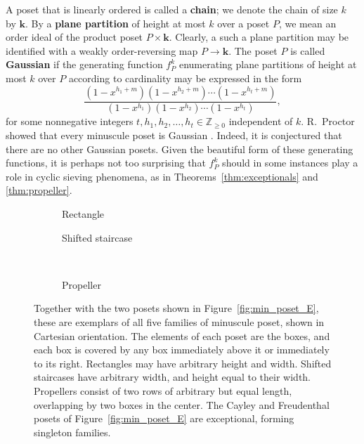 \documentclass[12pt]{amsart}
\theoremstyle{definition}
\theoremstyle{remark}
\numberwithin{equation}{section}
\begin{document}
A poset that is linearly ordered is called a {\bf chain}; we denote the chain of size $k$ by $\mathbf{k}$. By a {\bf plane partition} of height at most $k$ over a poset $P$, we mean an order ideal of the product poset $P \times \mathbf{k}$.  Clearly, a such a plane partition may be identified with a weakly order-reversing map $P \to \mathbf{k}$. The poset $P$ is called {\bf Gaussian} if the generating function $f_P^k$ enumerating plane partitions of height at most $k$ over $P$ according to cardinality may be expressed in the form
\[
\frac{(1 - x^{h_1 + m})(1 - x^{h_2 + m})\cdots(1 - x^{h_t + m})}{(1 - x^{h_1})(1 - x^{h_2})\cdots(1 - x^{h_t})},
\]
for some nonnegative integers $t, h_1, h_2, \dots, h_t \in \mathbb{Z}_{\geq 0}$ independent of $k$.
R.~Proctor showed that every minuscule poset is Gaussian \cite{Proctor}. Indeed, it is conjectured that there are no other Gaussian posets. Given the beautiful form of these generating functions, it is perhaps not too surprising that $f_P^k$ should in some instances play a role in cyclic sieving phenomena, as in Theorems~\ref{thm:exceptionals} and \ref{thm:propeller}.

\begin{figure}[h]
	\begin{subfigure}[b]{0.27\textwidth}
		\centering
		\caption{Rectangle}
	\end{subfigure}
	\hspace{2cm}
	\begin{subfigure}[b]{0.27\textwidth}
		\centering
		\caption{Shifted staircase}
	\end{subfigure} \\
	\vspace{3mm}
	\begin{subfigure}[b]{0.27\textwidth}
		\centering
		\caption{Propeller}
	\end{subfigure}
\caption{Together with the two posets shown in Figure~\ref{fig:min_poset_E}, these are exemplars of all five families of minuscule poset, shown in Cartesian orientation. The elements of each poset are the boxes, and each box is covered by any box immediately above it or immediately to its right. Rectangles may have arbitrary height and width. Shifted staircases have arbitrary width, and height equal to their width. Propellers consist of two rows of arbitrary but equal length, overlapping by two boxes in the center. The Cayley and Freudenthal posets of Figure~\ref{fig:min_poset_E} are exceptional, forming singleton families.}\label{fig:min_poset}
\end{figure}
\end{document}
